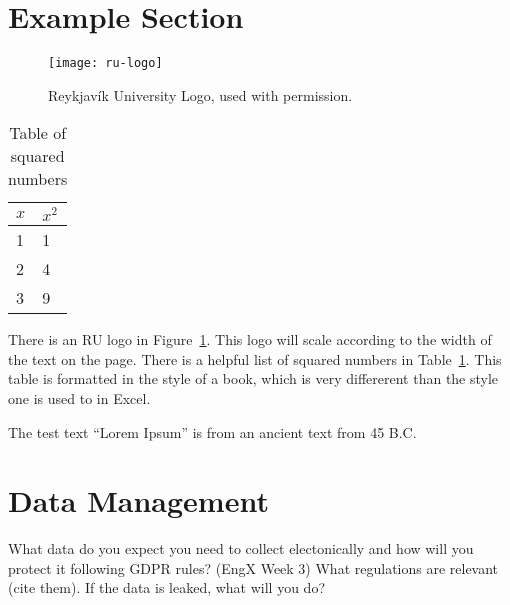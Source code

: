 \section{Example Section}
\begin{figure}
  \centering
  \texttt{[image: ru-logo]}
  \caption[RU Logo]{Reykjavík University Logo, used with permission.}\label{fig:ru-logo}
\end{figure}
\begin{table}
  \centering
  \begin{tabular}{ll}\toprule
    $x$& $x^{2}$\\\midrule
    1 &1\\
    2 &4\\
    3 &9\\\bottomrule
  \end{tabular}
  \caption{Table of squared numbers}\label{tab:numbers}
\end{table}
There is an RU logo in Figure~\ref{fig:ru-logo}.
This logo will scale according to the width of the text on the page.
There is a helpful list of squared numbers in Table~\ref{tab:numbers}.
This table is formatted in the style of a book, which is very differerent than the style one is used to in Excel.

The test text ``Lorem Ipsum'' is from an ancient text from 45 B.C. \cite{cicero46deFinibus, lipsomwebsite}\\
\lipsum[1-5]


\section{Data Management}
What data do you expect you need to collect electonically and how will you protect it following GDPR rules?  (EngX Week 3)
What regulations are relevant (cite them).
If the data is leaked, what will you do?

